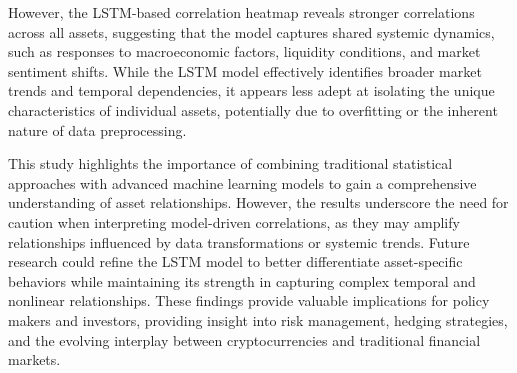 \documentclass{article}
\begin{document}
However, the LSTM-based correlation heatmap reveals stronger correlations across all assets, suggesting that the model captures shared systemic dynamics, such as responses to macroeconomic factors, liquidity conditions, and market sentiment shifts. While the LSTM model effectively identifies broader market trends and temporal dependencies, it appears less adept at isolating the unique characteristics of individual assets, potentially due to overfitting or the inherent nature of data preprocessing.

This study highlights the importance of combining traditional statistical approaches with advanced machine learning models to gain a comprehensive understanding of asset relationships. However, the results underscore the need for caution when interpreting model-driven correlations, as they may amplify relationships influenced by data transformations or systemic trends. Future research could refine the LSTM model to better differentiate asset-specific behaviors while maintaining its strength in capturing complex temporal and nonlinear relationships. These findings provide valuable implications for policy makers and investors, providing insight into risk management, hedging strategies, and the evolving interplay between cryptocurrencies and traditional financial markets.



\newpage


\end{document}
